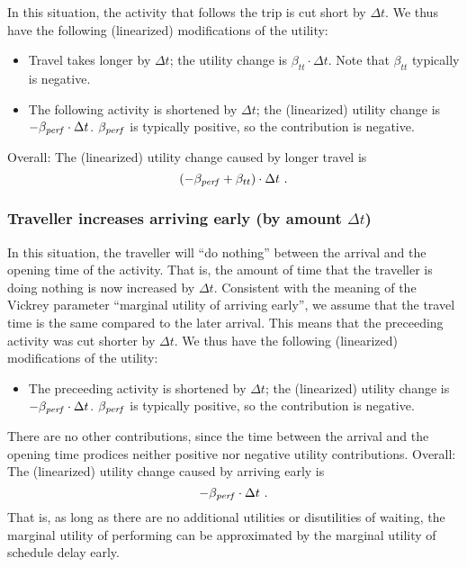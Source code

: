 In this situation, the activity that follows the trip is cut short by  $\Delta t$. We thus have the following (linearized) modifications  of the utility:
\begin{itemize}

\item Travel takes longer by $\Delta t$; the utility change is  $\beta_{tt} \cdot \Delta t$. Note that $\beta_{tt}$ typically is  negative.

\item The following activity is shortened by $\Delta t$; the (linearized)  utility change is $- \beta_{\it perf} \cdot \Delta t$.  $\beta_{\it perf}$ is  typically positive, so the contribution is negative.

\end{itemize}
Overall: The (linearized) utility change caused by longer travel is
\[
( - \beta_{\it perf} + \beta_{tt} ) \cdot \Delta t \ .
\]


\subsubsection{Traveller increases arriving early (by amount $\Delta t$)}

In this situation, the traveller will ``do nothing'' between the  arrival and the opening time of the activity. That is, the amount  of time that the traveller is doing nothing is now increased by  $\Delta t$. Consistent with the meaning of the Vickrey parameter  ``marginal utility of arriving early'', we assume that the travel time is  the same compared to the later arrival. This means that the preceeding  activity was cut shorter by $\Delta t$. We thus have the following  (linearized) modifications of the utility:
\begin{itemize}

\item The preceeding activity is shortened by $\Delta t$; the
(linearized) utility change is $- \beta_{\it perf} \cdot \Delta t$.
	$\beta_{\it perf}$ is typically positive, so the contribution is
	negative.

\end{itemize}
There are no other contributions, since the time between the  arrival and the opening time prodices neither positive nor negative  utility contributions. Overall: The (linearized) utility change  caused by arriving early is
\[
- \beta_{\it perf} \cdot \Delta t \ .
\]
That is, as long as there are no  additional utilities or disutilities of waiting, the marginal utility of  performing can be approximated by the marginal utility of schedule  delay early.


